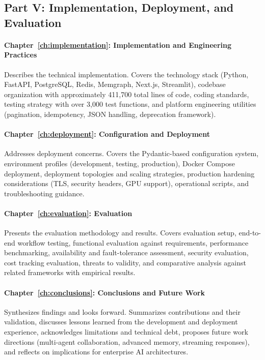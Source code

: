 \documentclass[a4paper,twoside]{sapthesis}
\begin{document}
\subsection{Part V: Implementation, Deployment, and Evaluation}

\paragraph{Chapter~\ref{ch:implementation}: Implementation and Engineering Practices}
Describes the technical implementation. Covers the technology stack (Python, FastAPI, PostgreSQL, Redis, Memgraph, Next.js, Streamlit), codebase organization with approximately 411,700 total lines of code, coding standards, testing strategy with over 3,000 test functions, and platform engineering utilities (pagination, idempotency, JSON handling, deprecation framework).

\paragraph{Chapter~\ref{ch:deployment}: Configuration and Deployment}
Addresses deployment concerns. Covers the Pydantic-based configuration system, environment profiles (development, testing, production), Docker Compose deployment, deployment topologies and scaling strategies, production hardening considerations (TLS, security headers, GPU support), operational scripts, and troubleshooting guidance.

\paragraph{Chapter~\ref{ch:evaluation}: Evaluation}
Presents the evaluation methodology and results. Covers evaluation setup, end-to-end workflow testing, functional evaluation against requirements, performance benchmarking, availability and fault-tolerance assessment, security evaluation, cost tracking evaluation, threats to validity, and comparative analysis against related frameworks with empirical results.

\paragraph{Chapter~\ref{ch:conclusions}: Conclusions and Future Work}
Synthesizes findings and looks forward. Summarizes contributions and their validation, discusses lessons learned from the development and deployment experience, acknowledges limitations and technical debt, proposes future work directions (multi-agent collaboration, advanced memory, streaming responses), and reflects on implications for enterprise AI architectures.
\end{document}
